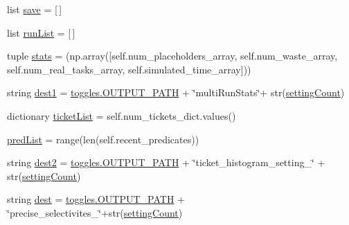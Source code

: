 \begin{DoxyCompactItemize}
\item 
list \mbox{\hyperlink{classdynamicfilterapp_1_1test__simulations_1_1_simulation_test_aa53b18c2bb4cfef68354cc568fae8e98}{save}} = \mbox{[}$\,$\mbox{]}
\item 
list \mbox{\hyperlink{classdynamicfilterapp_1_1test__simulations_1_1_simulation_test_af0a015ca9f30cd7a3f0fdade090df146}{run\+List}} = \mbox{[}$\,$\mbox{]}
\item 
tuple \mbox{\hyperlink{classdynamicfilterapp_1_1test__simulations_1_1_simulation_test_a7735d195f566a3c7a06a23cecd0d22df}{stats}} = (np.\+array(\mbox{[}self.\+num\+\_\+placeholders\+\_\+array, self.\+num\+\_\+waste\+\_\+array, self.\+num\+\_\+real\+\_\+tasks\+\_\+array, self.\+simulated\+\_\+time\+\_\+array\mbox{]}))
\item 
string \mbox{\hyperlink{classdynamicfilterapp_1_1test__simulations_1_1_simulation_test_a378bd708ce64c9205a9d5b7ef5179008}{dest1}} = \mbox{\hyperlink{namespacedynamicfilterapp_1_1toggles_a04644ded1d5e3fc8bd58a411209b7886}{toggles.\+O\+U\+T\+P\+U\+T\+\_\+\+P\+A\+TH}} + \char`\"{}multi\+Run\+Stats\char`\"{}+ str(\mbox{\hyperlink{classdynamicfilterapp_1_1test__simulations_1_1_simulation_test_a18e9dc3d267483ccc2dbacf54439c5ff}{setting\+Count}})
\item 
dictionary \mbox{\hyperlink{classdynamicfilterapp_1_1test__simulations_1_1_simulation_test_a730cc0ea27c2fcb7b9cacd041f88e6fc}{ticket\+List}} = self.\+num\+\_\+tickets\+\_\+dict.\+values()
\item 
\mbox{\hyperlink{classdynamicfilterapp_1_1test__simulations_1_1_simulation_test_a8c4afebfe163bfabdc976314d726eca9}{pred\+List}} = range(len(self.\+recent\+\_\+predicates))
\item 
string \mbox{\hyperlink{classdynamicfilterapp_1_1test__simulations_1_1_simulation_test_a55df54097e78f89cfbea1eac42c38c6c}{dest2}} = \mbox{\hyperlink{namespacedynamicfilterapp_1_1toggles_a04644ded1d5e3fc8bd58a411209b7886}{toggles.\+O\+U\+T\+P\+U\+T\+\_\+\+P\+A\+TH}} + \char`\"{}ticket\+\_\+histogram\+\_\+setting\+\_\+\char`\"{} + str(\mbox{\hyperlink{classdynamicfilterapp_1_1test__simulations_1_1_simulation_test_a18e9dc3d267483ccc2dbacf54439c5ff}{setting\+Count}})
\item 
string \mbox{\hyperlink{classdynamicfilterapp_1_1test__simulations_1_1_simulation_test_a66d4da94e0e4f717ff3e7f23c53f7c2d}{dest}} = \mbox{\hyperlink{namespacedynamicfilterapp_1_1toggles_a04644ded1d5e3fc8bd58a411209b7886}{toggles.\+O\+U\+T\+P\+U\+T\+\_\+\+P\+A\+TH}} + \char`\"{}precise\+\_\+selectivites\+\_\+\char`\"{}+str(\mbox{\hyperlink{classdynamicfilterapp_1_1test__simulations_1_1_simulation_test_a18e9dc3d267483ccc2dbacf54439c5ff}{setting\+Count}})

\end{DoxyCompactItemize}
